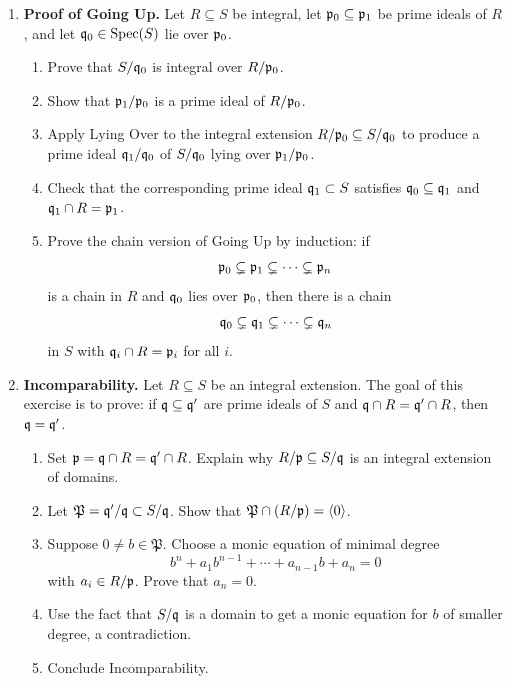 \documentclass[12pt,reqno]{amsart}
\begin{document}
\begin{enumerate}[leftmargin=*, resume=problems]

\item \textbf{Proof of Going Up.} Let $R\subseteq S$ be integral, let $\mathfrak{p}_0\subseteq \mathfrak{p}_1$ be prime ideals of $R$, and let $\mathfrak{q}_0\in\operatorname{Spec}(S)$ lie over $\mathfrak{p}_0$.
\begin{enumerate}
    \item Prove that $S/\mathfrak{q}_0$ is integral over $R/\mathfrak{p}_0$.
    \item Show that $\mathfrak{p}_1/\mathfrak{p}_0$ is a prime ideal of $R/\mathfrak{p}_0$.
    \item Apply Lying Over to the integral extension $R/\mathfrak{p}_0\subseteq S/\mathfrak{q}_0$ to produce a prime ideal $\mathfrak{q}_1/\mathfrak{q}_0$ of $S/\mathfrak{q}_0$ lying over $\mathfrak{p}_1/\mathfrak{p}_0$.
    \item Check that the corresponding prime ideal $\mathfrak{q}_1\subset S$ satisfies $\mathfrak{q}_0\subseteq \mathfrak{q}_1$ and $\mathfrak{q}_1\cap R=\mathfrak{p}_1$.
    \item Prove the chain version of Going Up by induction: if
    \[
    \mathfrak{p}_0\subsetneq \mathfrak{p}_1\subsetneq\cdots\subsetneq \mathfrak{p}_n
    \]
    is a chain in $R$ and $\mathfrak{q}_0$ lies over $\mathfrak{p}_0$, then there is a chain
    \[
    \mathfrak{q}_0\subsetneq \mathfrak{q}_1\subsetneq\cdots\subsetneq \mathfrak{q}_n
    \]
    in $S$ with $\mathfrak{q}_i\cap R=\mathfrak{p}_i$ for all $i$.
\end{enumerate}

\item \textbf{Incomparability.} Let $R\subseteq S$ be an integral extension. The goal of this exercise is to prove: if $\mathfrak{q}\subseteq \mathfrak{q}'$ are prime ideals of $S$ and $\mathfrak{q}\cap R=\mathfrak{q}'\cap R$, then $\mathfrak{q}=\mathfrak{q}'$.
\begin{enumerate}
    \item Set $\mathfrak{p}=\mathfrak{q}\cap R=\mathfrak{q}'\cap R$. Explain why $R/\mathfrak{p}\subseteq S/\mathfrak{q}$ is an integral extension of domains.
    \item Let $\mathfrak P=\mathfrak{q}'/\mathfrak{q}\subset S/\mathfrak{q}$. Show that $\mathfrak P\cap (R/\mathfrak{p})=\langle 0\rangle$.
    \item Suppose $0\neq b\in \mathfrak P$. Choose a monic equation of minimal degree
    \[
    b^n+a_1b^{n-1}+\cdots+a_{n-1}b+a_n=0
    \]
    with $a_i\in R/\mathfrak{p}$. Prove that $a_n=0$.
    \item Use the fact that $S/\mathfrak{q}$ is a domain to get a monic equation for $b$ of smaller degree, a contradiction.
    \item Conclude Incomparability.
\end{enumerate}


\end{enumerate}
\end{document}
